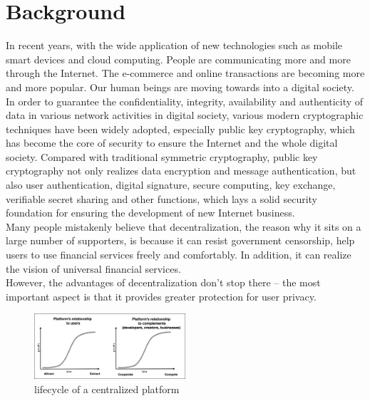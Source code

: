 \section{Background}
In recent years, with the wide application of new technologies such as mobile smart 
devices and cloud computing. People are communicating more and more through the Internet. 
The e-commerce and online transactions are becoming more and more popular. Our human 
beings are moving towards into a digital society\cite{b2}. In order to guarantee the confidentiality, 
integrity, availability and authenticity of data in various network activities in digital 
society, various modern cryptographic techniques have been widely adopted, especially 
public key cryptography, which has become the core of security to ensure the Internet and 
the whole digital society\cite{b1}. Compared with traditional symmetric cryptography, public key 
cryptography not only realizes data encryption and message authentication, but also user 
authentication, digital signature, secure computing, key exchange, verifiable secret 
sharing and other functions, which lays a solid security foundation for ensuring the 
development of new Internet business\cite{b4}.
\\
Many people mistakenly believe that decentralization, the reason why it sits on a 
large number of supporters, is because it can resist government censorship, help 
users to use financial services freely and comfortably. In addition, it can realize the vision of 
universal financial services\cite{b3}.
\\
However, the advantages of decentralization don't stop there -- the most important 
aspect is that it provides greater protection for user privacy\cite{b16}.

\begin{figure}[H] %
\centering %
\includegraphics[width=0.5\textwidth]{figures/media.png} %
\caption{lifecycle of a centralized platform} %
\label{Fig.1: lifecycle of a centralized platform} %
\end{figure}

